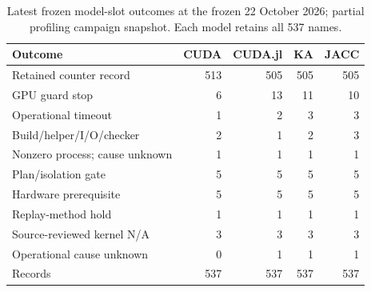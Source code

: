 \begin{table}[t]
\centering\small
\caption{Latest frozen model-slot outcomes at the frozen 22 October 2026; partial profiling campaign snapshot. Each model retains all 537 names.}
\label{tab:roofline-failures-latest}
\begin{tabular}{lrrrr}
\toprule
Outcome & CUDA & CUDA.jl & KA & JACC \\
\midrule
Retained counter record & 513 & 505 & 505 & 505 \\
GPU guard stop & 6 & 13 & 11 & 10 \\
Operational timeout & 1 & 2 & 3 & 3 \\
Build/helper/I/O/checker & 2 & 1 & 2 & 3 \\
Nonzero process; cause unknown & 1 & 1 & 1 & 1 \\
Plan/isolation gate & 5 & 5 & 5 & 5 \\
Hardware prerequisite & 5 & 5 & 5 & 5 \\
Replay-method hold & 1 & 1 & 1 & 1 \\
Source-reviewed kernel N/A & 3 & 3 & 3 & 3 \\
Operational cause unknown & 0 & 1 & 1 & 1 \\
\midrule
Records & 537 & 537 & 537 & 537 \\
\bottomrule
\end{tabular}
\end{table}
